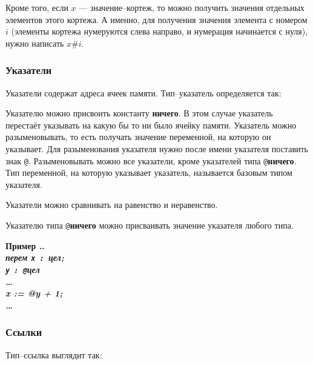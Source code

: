 \documentclass[10pt]{report}
\newcounter{exam}[section]
\renewcommand{\theexam}{\thesection.\arabic{exam}}
\newenvironment{Example}{\par\refstepcounter{exam}\bf Пример \theexam. \sl}{\rm\par}
\begin{document}
Кроме того, если $x$ --- значение--кортеж, то можно получить значения отдельных элементов этого кортежа. А именно, для получения значения элемента с номером $i$ (элементы кортежа нумеруются слева направо, и нумерация начинается с нуля), нужно написать $x\texttt{\#}i$.

        \subsubsection{Указатели}
Указатели содержат адреса ячеек памяти. Тип--указатель определяется так:
\begin{center}
\noindent\textcolor{Green}{}
\end{center}

Указателю можно присвоить константу \textbf{ничего}. В этом случае указатель перестаёт указывать на какую бы то ни было ячейку памяти. Указатель можно разыменовывать, то есть
получать значение переменной, на которую он указывает. Для разыменования указателя нужно после имени указателя поставить знак \texttt{@}. Разыменовывать можно все указатели,
кроме указателей типа \texttt{@}\textbf{ничего}. Тип переменной, на которую указывает указатель, называется базовым типом указателя.

Указатели можно сравнивать на равенство и неравенство. 

Указателю типа \texttt{@}\textbf{ничего} можно присваивать значение указателя любого типа.

\begin{Example}\\
\rm
\textbf{перем} \texttt{x : }\textbf{цел};\\
\hspace*{12mm}\texttt{y : @}\textbf{цел}\\
\hspace*{12mm}\dots\\
\hspace*{12mm}x := @y + 1;\\
\hspace*{12mm}\dots
\end{Example}

        \subsubsection{Ссылки}
Тип--ссылка выглядит так:        
\begin{center}
\noindent\textcolor{Green}{}
\end{center}
        
\end{document}
